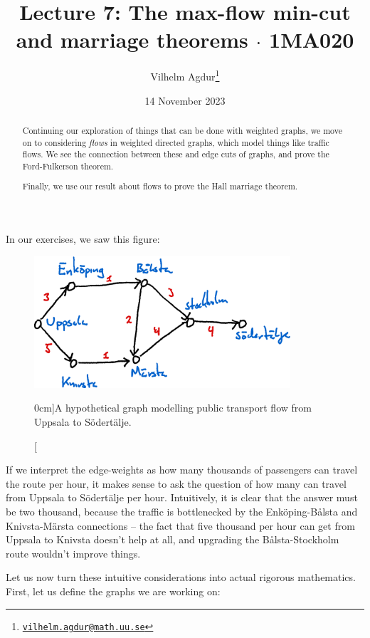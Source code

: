 \documentclass[nobib]{tufte-handout}
\title{Lecture 7: The max-flow min-cut and marriage theorems $\cdot$ 1MA020}
\author[Vilhelm Agdur]{Vilhelm Agdur\thanks{\href{mailto:vilhelm.agdur@math.uu.se}{\nolinkurl{vilhelm.agdur@math.uu.se}}}}
\date{14 November 2023}
\begin{document}
\maketitle%

\begin{abstract}
\noindent
Continuing our exploration of things that can be done with weighted graphs, we move on to considering \emph{flows} in weighted directed graphs, which model things like traffic flows. We see the connection between these and edge cuts of graphs, and prove the Ford-Fulkerson theorem.

Finally, we use our result about flows to prove the Hall marriage theorem.
\end{abstract}

In our exercises, we saw this figure:
\begin{figure}
    \centering
    \includegraphics[width=0.85\textwidth]{graphics/L5_exc_MSTs_etc/train_network_flow.png}
    \caption[][0cm]{A hypothetical graph modelling public transport flow from Uppsala to Södertälje.}
    \label{fig:uppsala_stockholm_traffic}
  \end{figure}

  If we interpret the edge-weights as how many thousands of passengers can travel the route per hour, it makes sense to ask the question of how many can travel from Uppsala to Södertälje per hour. Intuitively, it is clear that the answer must be two thousand, because the traffic is bottlenecked by the Enköping-Bålsta and Knivsta-Märsta connections -- the fact that five thousand per hour can get from Uppsala to Knivsta doesn't help at all, and upgrading the Bålsta-Stockholm route wouldn't improve things.

  Let us now turn these intuitive considerations into actual rigorous mathematics. First, let us define the graphs we are working on:
\end{document}
